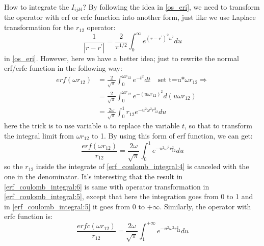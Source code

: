 How to integrate the $I_{ijkl}$? By following the idea in \ref{os_eri}, we need to transform
the operator with erf or erfc function into another form, just like we use Laplace transformation
for the $r_{12}$ operator:
\begin{equation}\label{erf_coulomb_integral:5}
 \frac{1}{|r-r^{'}|} = \frac{2}{\pi^{1/2}}\int^{\infty}_{0}
e^{(r-r^{'})^{2}u^{2}}du
\end{equation}
in \ref{os_eri}. However, here we have a better idea; just to rewrite the normal erf/erfc function
in the following way:
\begin{align}\label{erf_coulomb_integral:4}
 erf(\omega r_{12})  
 &= \frac{2}{\sqrt{\pi}}\int_{0}^{\omega r_{12}} e^{- t^{2}} dt \quad \text{set t=u*$\omega r_{12}$}
 \Rightarrow \nonumber \\ 
 &= \frac{2}{\sqrt{\pi}}\int_{0}^{\omega r_{12}} e^{- (u\omega r_{12})^{2}} d(u\omega r_{12}) \nonumber \\
 &= \frac{2\omega}{\sqrt{\pi}}\int_{0}^{1} r_{12}e^{- u^{2}\omega^{2}r_{12}^{2}} du 
\end{align}
here the trick is to use variable $u$ to replace the variable $t$, so that to transform the 
integral limit from $\omega r_{12}$ to 1. By using this form of erf function, we can get:
\begin{equation}\label{erf_coulomb_integral:6}
 \frac{erf(\omega r_{12})}{r_{12}} = 
 \frac{2\omega}{\sqrt{\pi}}\int_{0}^{1} e^{- u^{2}\omega^{2}r_{12}^{2}} du 
\end{equation}
so the $r_{12}$ inside the integrate of \ref{erf_coulomb_integral:4} is canceled with the 
one in the denominator. It's interesting that the result in \ref{erf_coulomb_integral:6}
is same with operator transformation in \ref{erf_coulomb_integral:5}, except that here
the integration goes from 0 to 1 and in \ref{erf_coulomb_integral:5} it goes from 0 to 
$+\infty$. Similarly, the operator with erfc function is:
\begin{equation}\label{erf_coulomb_integral:7}
 \frac{erfc(\omega r_{12})}{r_{12}} = 
 \frac{2\omega}{\sqrt{\pi}}\int_{1}^{+\infty} e^{- u^{2}\omega^{2}r_{12}^{2}} du 
\end{equation}

